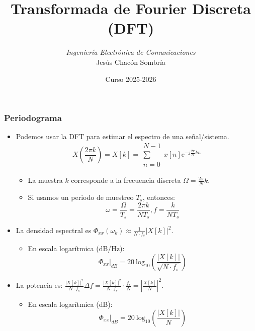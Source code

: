 \documentclass{beamer}
\title[Procesamiento de Señales]{Transformada de Fourier Discreta (DFT)}
\author[J. Chacón]{%
\textit{Ingeniería Electrónica de Comunicaciones }\\
\vspace{0.6cm}
\small Jesús Chacón Sombría}
\institute[DACYA] %
{

\footnotesize  Departamento de Arquitectura de Computadores y Automática.\\
  Universidad Complutense de Madrid
  }
\date[Transformada Fourier Discreta] %
{\footnotesize Curso 2025-2026}%
\newcommand{\MyLogo}{%
\begin{textblock}{14}(116.0,0.6)
  \pgfuseimage{logo}
\end{textblock}
}
\numberwithin{section}{part}
\begin{document}
\begin{frame}
  \titlepage
\end{frame}

\newcommand*\oldmacro{}%
\let\oldmacro\insertshorttitle%
\renewcommand*\insertshorttitle{%
 \MyLogo
  \oldmacro\hfill%
}

\AtBeginSection[]{}

\AtBeginSubsection[]{}      

\begin{frame}
  \frametitle{Periodograma}
  
  \footnotesize
  \begin{itemize}
    \item \alert{Podemos usar la DFT para estimar el espectro de una señal/sistema.}
    \[
    X(\frac{2\pi k}{N})=X[k]=\substack{N-1\\\sum\\n=0}x[n]\text{e}^{-j\frac{2\pi}{N}kn}
    \]
    \begin{itemize}
      \item La muestra $k$ corresponde a la frecuencia discreta $\Omega=\frac{2\pi}{N}k$.
      \item Si usamos un periodo de muestreo $T_s$, entonces:
    \[
    \omega=\frac{\Omega}{T_s}=\frac{2\pi k}{N T_s},f=\frac{k}{NT_s}
    \]
    \end{itemize}

    \item \alert{La densidad espectral es $\Phi_{xx}(\omega_k)\approx\frac{1}{N\cdot f_s}|X[k]|^2$.}
    \begin{itemize}
      \footnotesize
      \item En escala logarítmica (dB/Hz):
      \[
        \Phi_{xx}|_{dB} = 20\:\text{log}_{10}\left(\frac{|X[k]|}{\sqrt{N\cdot f_s}}\right)
      \]
    \end{itemize} 
    \item \alert{La potencia es: $\frac{|X[k]|^2}{N\cdot f_s}\Delta f=\frac{|X[k]|^2}{N\cdot f_s}\cdot\frac{f_s}{N}=|\frac{X[k]}{N}|^2$.}
    \begin{itemize}
      \footnotesize
      \item En escala logarítmica (dB):
      \[
        \Phi_{xx}|_{dB} = 20\:\text{log}_{10}\left(\frac{|X[k]|}{N}\right)
      \]
    \end{itemize} 
    
    

  \end{itemize}
\end{frame}
\end{document}
